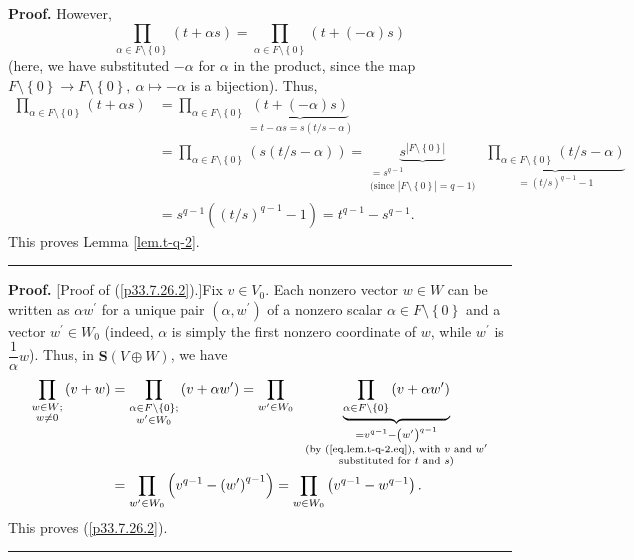 \documentclass[numbers=enddot,12pt,final,onecolumn,notitlepage]{scrartcl}%
\theoremstyle{definition}
\newenvironment{proof}[1][Proof]{\noindent\textbf{#1.} }{\ \rule{0.5em}{0.5em}}
\let\prodnonlimits\prod
\renewcommand{\prod}{\prodnonlimits\limits}
\begin{document}
\begin{enumerate}
\begin{proof}
However,%
\[
\prod_{\alpha\in F\setminus\left\{  0\right\}  }\left(  t+\alpha s\right)
=\prod_{\alpha\in F\setminus\left\{  0\right\}  }\left(  t+\left(
-\alpha\right)  s\right)
\]
(here, we have substituted $-\alpha$ for $\alpha$ in the product, since the
map $F\setminus\left\{  0\right\}  \rightarrow F\setminus\left\{  0\right\}
,\ \alpha\mapsto-\alpha$ is a bijection). Thus,%
\begin{align*}
\prod_{\alpha\in F\setminus\left\{  0\right\}  }\left(  t+\alpha s\right)   &
=\prod_{\alpha\in F\setminus\left\{  0\right\}  }\underbrace{\left(  t+\left(
-\alpha\right)  s\right)  }_{=t-\alpha s=s\left(  t/s-\alpha\right)  }\\
&  =\prod_{\alpha\in F\setminus\left\{  0\right\}  }\left(  s\left(
t/s-\alpha\right)  \right)  =\underbrace{s^{\left\vert F\setminus\left\{
0\right\}  \right\vert }}_{\substack{=s^{q-1}\\\text{(since }\left\vert
F\setminus\left\{  0\right\}  \right\vert =q-1\text{)}}}\ \ \underbrace{\prod
_{\alpha\in F\setminus\left\{  0\right\}  }\left(  t/s-\alpha\right)
}_{=\left(  t/s\right)  ^{q-1}-1}\\
&  =s^{q-1}\left(  \left(  t/s\right)  ^{q-1}-1\right)  =t^{q-1}-s^{q-1}.
\end{align*}
This proves Lemma \ref{lem.t-q-2}.
\end{proof}

\begin{proof}
[Proof of (\ref{p33.7.26.2}).]Fix $v\in V_{0}$. Each nonzero vector $w\in W$
can be written as $\alpha w^{\prime}$ for a unique pair $\left(
\alpha,w^{\prime}\right)  $ of a nonzero scalar $\alpha\in F\setminus\left\{
0\right\}  $ and a vector $w^{\prime}\in W_{0}$ (indeed, $\alpha$ is simply
the first nonzero coordinate of $w$, while $w^{\prime}$ is $\dfrac{1}{\alpha
}w$). Thus, in $\mathbf{S}\left(  V\oplus W\right)  $, we have
\begin{align*}
\prod_{\substack{w\in W;\\w\neq0}}\left(  v+w\right)   &  =\prod
_{\substack{\alpha\in F\setminus\left\{  0\right\}  ;\\w^{\prime}\in W_{0}%
}}\left(  v+\alpha w^{\prime}\right)  =\prod_{w^{\prime}\in W_{0}%
}\ \ \underbrace{\prod_{\alpha\in F\setminus\left\{  0\right\}  }\left(
v+\alpha w^{\prime}\right)  }_{\substack{=v^{q-1}-\left(  w^{\prime}\right)
^{q-1}\\\text{(by (\ref{eq.lem.t-q-2.eq}), with }v\text{ and }w^{\prime
}\\\text{substituted for }t\text{ and }s\text{)}}}\\
&  =\prod_{w^{\prime}\in W_{0}}\left(  v^{q-1}-\left(  w^{\prime}\right)
^{q-1}\right)  =\prod_{w\in W_{0}}\left(  v^{q-1}-w^{q-1}\right)  .
\end{align*}
This proves (\ref{p33.7.26.2}).
\end{proof}


\end{enumerate}
\end{document}
